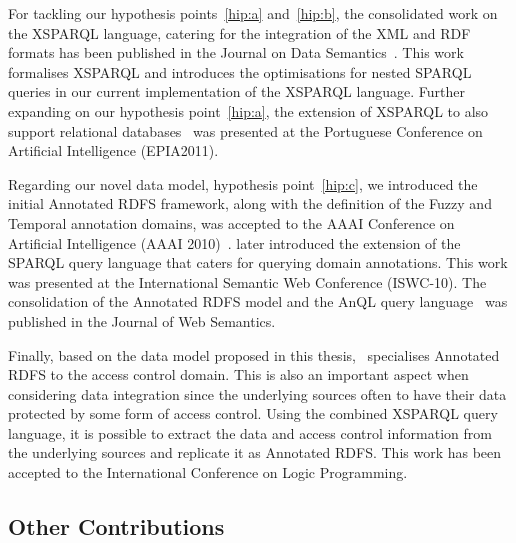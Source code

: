 For tackling our hypothesis points~\ref{hip:a} and~\ref{hip:b}, the consolidated work on the XSPARQL language, catering
for the integration of the \ac{XML} and \ac{RDF} formats has been published in the Journal on Data
Semantics~\cite{BischofDeckerKrennwallner:2012aa}.  This work formalises XSPARQL and introduces the optimisations for
nested SPARQL queries in our current implementation of the XSPARQL language.
%
Further expanding on our hypothesis point~\ref{hip:a}, the extension of XSPARQL to also support relational
databases~\cite{LopesBischofDecker2011aa} was presented at the Portuguese Conference on Artificial Intelligence
(EPIA2011).


Regarding our novel data model, hypothesis point~\ref{hip:c}, we introduced the initial Annotated RDFS framework, along
with the definition of the Fuzzy and Temporal annotation domains, was accepted to the AAAI Conference on Artificial
Intelligence (AAAI 2010)~\cite{StracciaLopesLukacsy:2010aa}.
%
\citet{LopesPolleresStraccia:2010aa} later introduced the extension of the SPARQL query language that caters for
querying domain annotations.  This work was presented at the International Semantic Web Conference (ISWC-10).
%
The consolidation of the Annotated RDFS model and the AnQL query language~\cite{ZimmermannLopesPolleres:2012aa} was
published in the Journal of Web Semantics.
%

Finally, based on the data model proposed in this thesis,~\citet{LopesKirraneZimmermann:2012aa} specialises Annotated
RDFS to the access control domain.  This is also an important aspect when considering data integration since the
underlying sources often to have their data protected by some form of access control.  
%
Using the combined XSPARQL query language, it is possible to extract the data and access control information from the
underlying sources and replicate it as Annotated RDFS.
%
This work has been accepted to the International Conference on Logic Programming.



\subsection{Other Contributions}
\label{sec:contr-stand}

